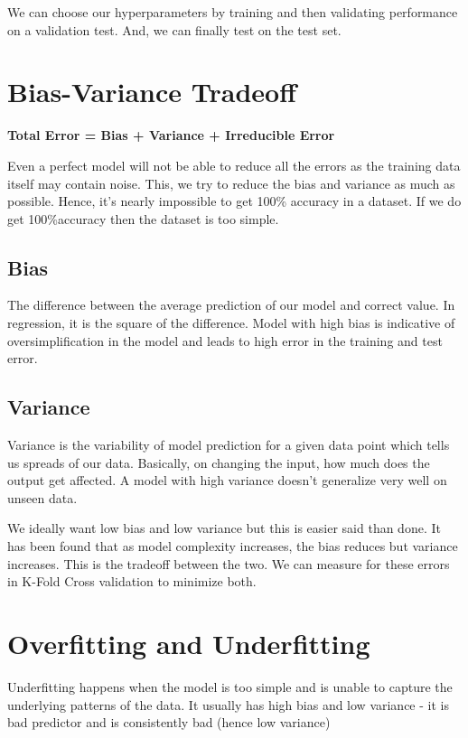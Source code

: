We can choose our hyperparameters by training and then validating performance on a validation test. And, we can finally test on the test set.

\section{Bias-Variance Tradeoff}

\begin{center}
    \textbf{Total Error = Bias + Variance + Irreducible Error}
\end{center}

Even a perfect model will not be able to reduce all the errors as the training data itself may contain noise. This, we try to reduce the bias and variance as much as possible. Hence, it's nearly impossible to get 100\% accuracy in a dataset. If we do get 100\%accuracy then the dataset is too simple. 

\subsection{Bias}

The difference between the average prediction of our model and correct value. In regression, it is the square of the difference. Model with high bias is indicative of oversimplification in the model and leads to high error in the training and test error.

\subsection{Variance}

Variance is the variability of model prediction for a given data point which tells us spreads of our data. Basically, on changing the input, how much does the output get affected. A model with high variance doesn't generalize very well on unseen data. 

We ideally want low bias and low variance but this is easier said than done. It has been found that as model complexity increases, the bias reduces but variance increases. This is the tradeoff between the two. We can measure for these errors in K-Fold Cross validation to minimize both.

\section{Overfitting and Underfitting}

Underfitting happens when the model is too simple and is unable to capture the underlying patterns of the data. It usually has high bias and low variance - it is bad predictor and is consistently bad (hence low variance)

